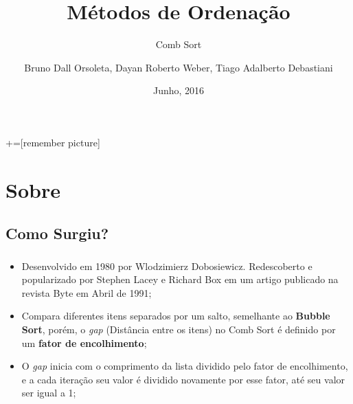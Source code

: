 \documentclass[aspectratio=169,table]{beamer}
\title{Métodos de Ordenação}
\subtitle{Comb Sort}
\author[Orsoletta{,} B. D.; Weber{,} D. R.; Debastiani{,} T. A.]{Bruno Dall Orsoleta, Dayan Roberto Weber, Tiago Adalberto Debastiani}
\institute[UFFS -- \textit{Campus} Chapecó] %
{%
  Estrutura de Dados I\\%
  Ciência da Computação\\%
  Universidade Federal da Fronteira Sul\\%
  \textit{Campus} Chapecó%
}
\date{Junho, 2016}
\begin{document}
+=[remember picture]

\everymath{\displaystyle}


\begin{frame}[label=titlepage]
  \titlepage
\end{frame}


\section{Sobre}
	\subsection{Como Surgiu?}
		\begin{frame}
			\frametitle{\secname}
			\framesubtitle{\subsecname}
			\begin{itemize}
				\item Desenvolvido em 1980 por Wlodzimierz Dobosiewicz. Redescoberto e popularizado por Stephen Lacey e Richard Box em um artigo publicado na revista Byte em Abril de 1991;
				\item Compara diferentes itens separados por um salto, semelhante ao \textbf{Bubble Sort}, porém, o \textit{gap} (Distância entre os itens) no Comb Sort é definido por um \textbf{fator de encolhimento};
				\item O \textit{gap} inicia com o comprimento da lista dividido pelo fator de encolhimento, e a cada iteração seu valor é dividido novamente por esse fator, até seu valor ser igual a 1;
			\end{itemize}
		\end{frame}
\end{document}
